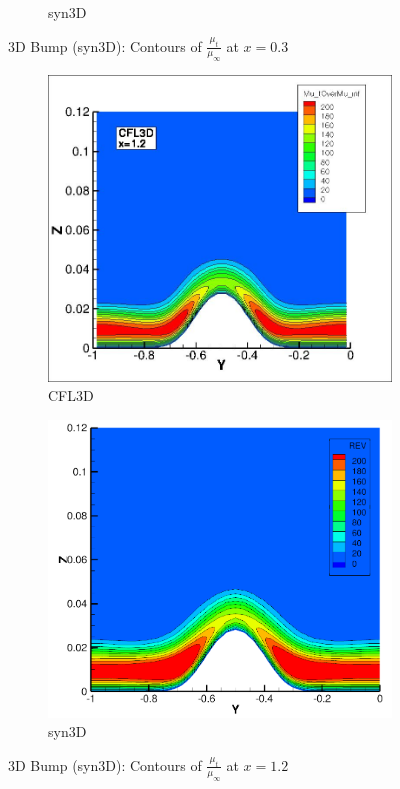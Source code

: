 \begin{figure}[ht!]
\begin{subfigure}{.45\textwidth}
  \caption{syn3D}
\end{subfigure}
\caption{3D Bump (syn3D): Contours of $\frac{\mu_t}{\mu_{\infty}}$ at $x=0.3$}
\label{fig:syn3dbumpmut03}
\end{figure}

\begin{figure}[ht!]
\centering
\begin{subfigure}{.45\textwidth}
  \centering
  \includegraphics[width=1.0\textwidth]{figs/3dbump/mut_12_cfl3d.jpg}
  \caption{CFL3D}
\end{subfigure}%
\begin{subfigure}{.45\textwidth}
  \centering
  \includegraphics[width=1.0\textwidth]{figs/3dbump/x12Rev.png}
  \caption{syn3D}
\end{subfigure}
\caption{3D Bump (syn3D): Contours of $\frac{\mu_t}{\mu_{\infty}}$ at $x=1.2$}
\label{fig:syn3dbumpmut12}
\end{figure}

